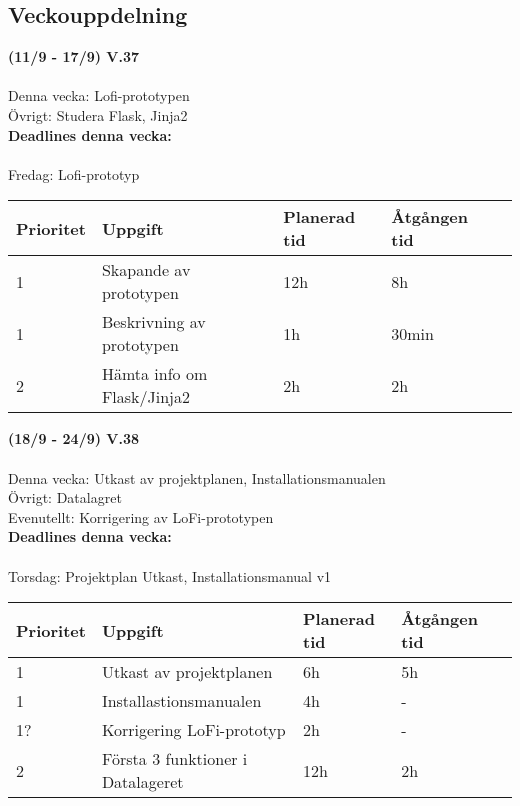 \documentclass{TDP003mall}
\begin{document}
\subsection{Veckouppdelning}
\textbf{(11/9 - 17/9) V.37}\\\\
Denna vecka: Lofi-prototypen\\
Övrigt: Studera Flask, Jinja2\\

\textbf{Deadlines denna vecka: }\\\\
Fredag: Lofi-prototyp

\begin{table}[]
  \begin{tabular}{|l|l|l|l|l|}
  \hline
   Prioritet & Uppgift                    & Planerad tid & Åtgången tid \\ \hline
   1         & Skapande av prototypen     & 12h          & 8h           \\ \hline
   1         & Beskrivning av prototypen  & 1h           & 30min        \\ \hline
   2         & Hämta info om Flask/Jinja2 & 2h           & 2h           \\ \hline
  \end{tabular}
  \end{table}


  \hrulefill
  \vspace{6em}

\textbf{(18/9 - 24/9) V.38}\\\\
  Denna vecka: Utkast av projektplanen, Installationsmanualen\\
  Övrigt: Datalagret\\
  Evenutellt: Korrigering av LoFi-prototypen\\

  \textbf{Deadlines denna vecka: }\\\\
  Torsdag: Projektplan Utkast, Installationsmanual v1


\begin{table}[]
  \begin{tabular}{|l|l|l|l|l|}
  \hline
   Prioritet & Uppgift                    & Planerad tid & Åtgången tid \\ \hline
   1         & Utkast av projektplanen  & 6h          & 5h          \\ \hline
   1         & Installastionsmanualen  & 4h           & -       \\ \hline
   1?        & Korrigering LoFi-prototyp &2h          & -       \\ \hline
   2         & Första 3 funktioner i Datalageret & 12h           & 2h          \\ \hline
  \end{tabular}
  \end{table}
\end{document}
